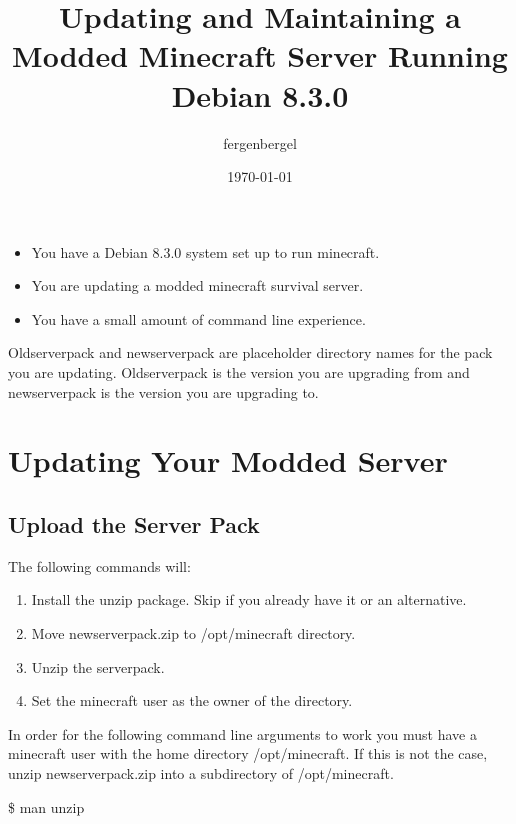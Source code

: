 \documentclass{report}
\title{Updating and Maintaining a Modded Minecraft Server Running Debian 8.3.0}
\author{fergenbergel}
\date{\today}
\begin{document}
\maketitle

{\hypersetup{linkcolor=black}
	\centering
	\tableofcontents
}

\pagebreak

\begin{mdframed}[style=Note, frametitle=Note: Document Use Case]
	\begin{itemize}
		\item You have a Debian 8.3.0 system set up to run minecraft. 
		\item You are updating a modded minecraft survival server.
		\item You have a small amount of command line experience.
	\end{itemize}
\end{mdframed}

\begin{mdframed}[style=Note, frametitle=Note: oldserverpack and newserverpack]
Oldserverpack and newserverpack are placeholder directory names for the pack you are updating. Oldserverpack is the version you are upgrading from and newserverpack is the version you are upgrading to.
\end{mdframed}

\chapter{Updating Your Modded Server}

\section{Upload the Server Pack}
The following commands will:
\begin{enumerate}
	\item Install the unzip package. Skip if you already have it or an alternative. 
	\item Move newserverpack.zip to /opt/minecraft directory.
	\item Unzip the serverpack.
	\item Set the minecraft user as the owner of the directory.
\end{enumerate}

\begin{mdframed}[style=Note]
In order for the following command line arguments to work you must have a minecraft user with the home directory /opt/minecraft. If this is not the case, unzip newserverpack.zip into a subdirectory of /opt/minecraft. 
	\begin{mdframed}[style=Code, frametitle=Command Line More Information on Unzip:]
	\$ man unzip
	\end{mdframed}
\end{mdframed}
\end{document}
